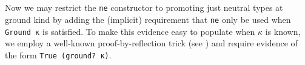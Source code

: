 \documentclass[authoryear, acmsmall, screen, review, nonacm]{acmart}
\begin{document}
\begin{code}%
\>[0]\AgdaSpace{}%
\AgdaSymbol{:}\AgdaSpace{}%
\AgdaSpace{}%
\AgdaSpace{}%
\AgdaSpace{}%
\AgdaSpace{}%
\AgdaSymbol{(}\AgdaSpace{}%
\AgdaSymbol{)}\<%
\\
\>[0]\AgdaSpace{}%
\AgdaSpace{}%
\AgdaSymbol{=}\AgdaSpace{}%
\AgdaSpace{}%
\<%
\\
\>[0]\AgdaSpace{}%
\AgdaSpace{}%
\AgdaSymbol{=}\AgdaSpace{}%
\AgdaSpace{}%
\<%
\\
\>[0]\AgdaSpace{}%
\AgdaSymbol{(\AgdaUnderscore{}}\AgdaSpace{}%
\AgdaSpace{}%
\AgdaSymbol{\AgdaUnderscore{})}\AgdaSpace{}%
\AgdaSymbol{=}\AgdaSpace{}%
\AgdaSpace{}%
\AgdaSpace{}%
\AgdaSymbol{())}\<%
\\
\>[0]\AgdaSpace{}%
\AgdaOperator{\AgdaInductiveConstructor{R[}}\AgdaSpace{}%
\AgdaSymbol{\AgdaUnderscore{}}\AgdaSpace{}%
\AgdaOperator{\AgdaInductiveConstructor{]}}\AgdaSpace{}%
\AgdaSymbol{=}\AgdaSpace{}%
\AgdaSpace{}%
\<%
\end{code}

Now we may restrict the \verb!ne! constructor to promoting just neutral types at ground kind by adding the (implicit) requirement that \verb!ne! only be used when \verb!Ground κ! is satisfied. To make this evidence easy to populate when $\kappa$ is known, we employ a well-known proof-by-reflection trick (see \citet{plfa22}) and require evidence of the form \verb!True (ground? κ)!.
\end{document}
